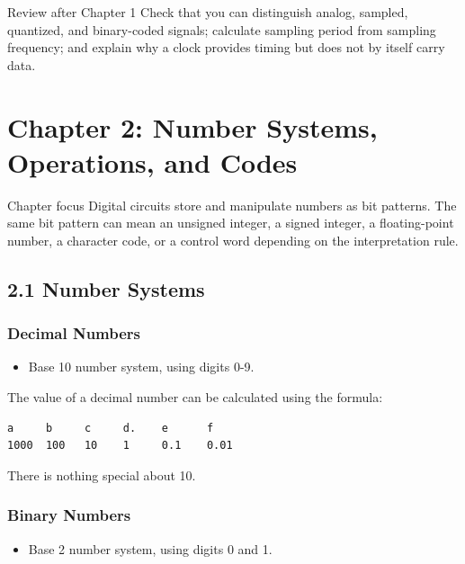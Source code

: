 \documentclass[11pt,a4paper]{article}
\providecommand{\tightlist}{\setlength{\itemsep}{1pt}\setlength{\parskip}{0pt}}
\begin{document}
\begin{notebox}{Review after Chapter 1}
Check that you can distinguish analog, sampled, quantized, and binary-coded signals; calculate sampling period from sampling frequency; and explain why a clock provides timing but does not by itself carry data.
\end{notebox}

\section{Chapter 2: Number Systems, Operations, and
Codes}\label{chapter-2-number-systems-operations-and-codes}

\begin{chapterbox}{Chapter focus}
Digital circuits store and manipulate numbers as bit patterns. The same bit pattern can mean an unsigned integer, a signed integer, a floating-point number, a character code, or a control word depending on the interpretation rule.
\end{chapterbox}

\subsection{2.1 Number Systems}\label{number-systems}

\subsubsection{Decimal Numbers}\label{decimal-numbers}

\begin{itemize}
\tightlist
\item
  Base 10 number system, using digits 0-9.
\end{itemize}

The value of a decimal number can be calculated using the formula:

\begin{verbatim}
a     b     c     d.    e      f
1000  100   10    1     0.1    0.01
\end{verbatim}

There is nothing special about 10.

\subsubsection{Binary Numbers}\label{binary-numbers}

\begin{itemize}
\tightlist
\item
  Base 2 number system, using digits 0 and 1.
\end{itemize}
\end{document}
